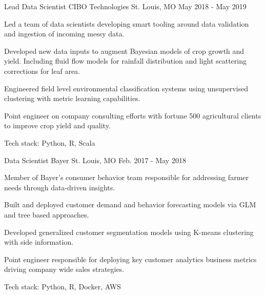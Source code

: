 \begin{cventries}

  \cventry
    {Lead Data Scientist} %
    {CIBO Technologies} %
    {St. Louis, MO} %
    {May 2018 - May 2019} %
    {
      \begin{cvitems} %
        \item {Led a team of data scientists developing smart tooling around data validation and ingestion of incoming messy data.}
        \item {Developed new data inputs to augment Bayesian models of crop growth and yield. Including fluid flow models for rainfall distribution and light scattering corrections for leaf area.} 
        \item {Engineered field level environmental classification systems using unsupervised clustering with metric learning capabilities.}
        \item {Point engineer on company consulting efforts with fortune 500 agricultural clients to improve crop yield and quality.}
        \item {Tech stack: Python, R, Scala}
      \end{cvitems}
    }

  \cventry
    {Data Scientist} %
    {Bayer} %
    {St. Louis, MO} %
    {Feb. 2017 - May 2018} %
    {
      \begin{cvitems} %
        \item {Member of Bayer's consumer behavior team responsible for addressing farmer needs through data-driven insights.}
        \item {Built and deployed customer demand and behavior forecasting models via GLM and tree based approaches.}
        \item {Developed generalized customer segmentation models using K-means clustering with side information.}
        \item {Point engineer responsible for deploying key customer analytics business metrics driving company wide sales strategies.}
        \item {Tech stack: Python, R, Docker, AWS}
      \end{cvitems}
    }


\end{cventries}
